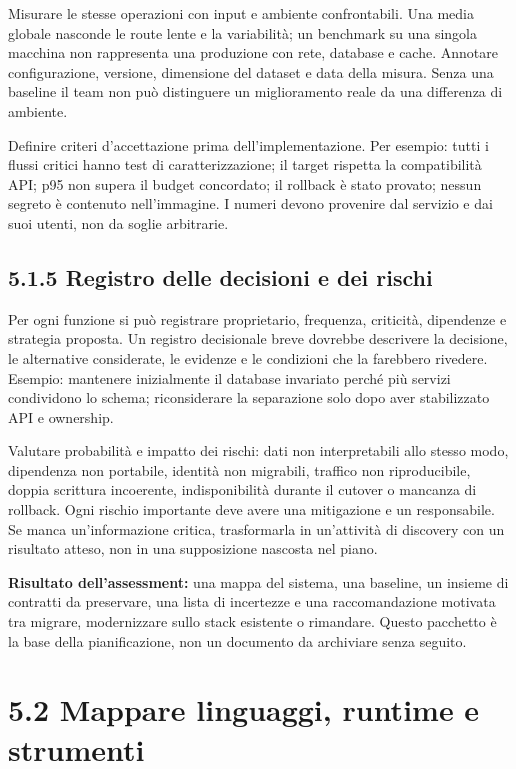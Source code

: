 \documentclass[
  italian,
  10pt,
]{book}
\begin{document}
Misurare le stesse operazioni con input e ambiente confrontabili. Una
media globale nasconde le route lente e la variabilità; un benchmark su
una singola macchina non rappresenta una produzione con rete, database e
cache. Annotare configurazione, versione, dimensione del dataset e data
della misura. Senza una baseline il team non può distinguere un
miglioramento reale da una differenza di ambiente.

Definire criteri d'accettazione prima dell'implementazione. Per esempio:
tutti i flussi critici hanno test di caratterizzazione; il target
rispetta la compatibilità API; p95 non supera il budget concordato; il
rollback è stato provato; nessun segreto è contenuto nell'immagine. I
numeri devono provenire dal servizio e dai suoi utenti, non da soglie
arbitrarie.

\subsection{5.1.5 Registro delle decisioni e dei
rischi}\label{registro-delle-decisioni-e-dei-rischi}

Per ogni funzione si può registrare proprietario, frequenza, criticità,
dipendenze e strategia proposta. Un registro decisionale breve dovrebbe
descrivere la decisione, le alternative considerate, le evidenze e le
condizioni che la farebbero rivedere. Esempio: mantenere inizialmente il
database invariato perché più servizi condividono lo schema;
riconsiderare la separazione solo dopo aver stabilizzato API e
ownership.

Valutare probabilità e impatto dei rischi: dati non interpretabili allo
stesso modo, dipendenza non portabile, identità non migrabili, traffico
non riproducibile, doppia scrittura incoerente, indisponibilità durante
il cutover o mancanza di rollback. Ogni rischio importante deve avere
una mitigazione e un responsabile. Se manca un'informazione critica,
trasformarla in un'attività di discovery con un risultato atteso, non in
una supposizione nascosta nel piano.

\textbf{Risultato dell'assessment:} una mappa del sistema, una baseline,
un insieme di contratti da preservare, una lista di incertezze e una
raccomandazione motivata tra migrare, modernizzare sullo stack esistente
o rimandare. Questo pacchetto è la base della pianificazione, non un
documento da archiviare senza seguito.

\section{5.2 Mappare linguaggi, runtime e
strumenti}\label{mappare-linguaggi-runtime-e-strumenti}
\end{document}
